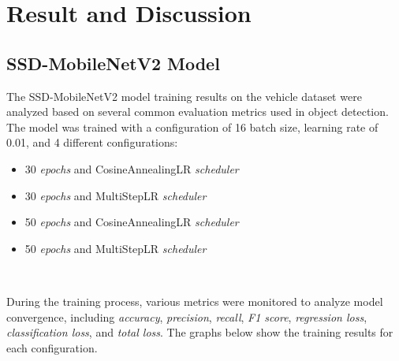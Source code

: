 \section{Result and Discussion}
\label{sec:resultanddiscussion}

\subsection{SSD-MobileNetV2 Model}
\label{sec:model_ssd_mobilenetv2}

The SSD-MobileNetV2 model training results on the vehicle dataset were analyzed based on several common evaluation metrics used in object detection. The model was trained with a configuration of 16 batch size, learning rate of 0.01, and 4 different configurations:

\begin{itemize}[nolistsep]
  \item 30 \emph{epochs} and CosineAnnealingLR \emph{scheduler}
  \item 30 \emph{epochs} and MultiStepLR \emph{scheduler}
  \item 50 \emph{epochs} and CosineAnnealingLR \emph{scheduler}
  \item 50 \emph{epochs} and MultiStepLR \emph{scheduler}
\end{itemize}\

During the training process, various metrics were monitored to analyze model convergence, including \emph{accuracy}, \emph{precision}, \emph{recall}, \emph{F1 score}, \emph{regression loss}, \emph{classification loss}, and \emph{total loss}. The graphs below show the training results for each configuration.


